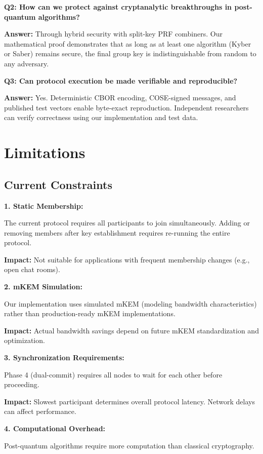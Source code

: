 \documentclass[12pt,a4paper]{report}
\begin{document}
\textbf{Q2: How can we protect against cryptanalytic breakthroughs in post-quantum algorithms?}

\textbf{Answer:} Through hybrid security with split-key PRF combiners. Our mathematical proof demonstrates that as long as at least one algorithm (Kyber or Saber) remains secure, the final group key is indistinguishable from random to any adversary.

\textbf{Q3: Can protocol execution be made verifiable and reproducible?}

\textbf{Answer:} Yes. Deterministic CBOR encoding, COSE-signed messages, and published test vectors enable byte-exact reproduction. Independent researchers can verify correctness using our implementation and test data.

\section{Limitations}

\subsection{Current Constraints}

\textbf{1. Static Membership:}

The current protocol requires all participants to join simultaneously. Adding or removing members after key establishment requires re-running the entire protocol.

\textbf{Impact:} Not suitable for applications with frequent membership changes (e.g., open chat rooms).

\textbf{2. mKEM Simulation:}

Our implementation uses simulated mKEM (modeling bandwidth characteristics) rather than production-ready mKEM implementations.

\textbf{Impact:} Actual bandwidth savings depend on future mKEM standardization and optimization.

\textbf{3. Synchronization Requirements:}

Phase 4 (dual-commit) requires all nodes to wait for each other before proceeding.

\textbf{Impact:} Slowest participant determines overall protocol latency. Network delays can affect performance.

\textbf{4. Computational Overhead:}

Post-quantum algorithms require more computation than classical cryptography.
\end{document}
